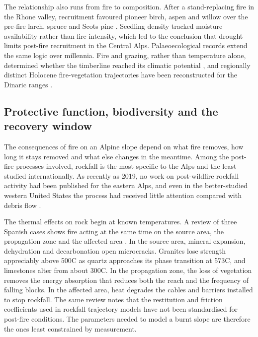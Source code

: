 \documentclass[11pt,a4paper]{article}
\begin{document}
The relationship also runs from fire to composition. After a stand-replacing fire in the Rhone valley, recruitment favoured pioneer birch, aspen and willow over the pre-fire larch, spruce and Scots pine \citep{moser_potential_2010}. Seedling density tracked moisture availability rather than fire intensity, which led to the conclusion that drought limits post-fire recruitment in the Central Alps. Palaeoecological records extend the same logic over millennia. Fire and grazing, rather than temperature alone, determined whether the timberline reached its climatic potential \citep{colombaroli_species_2010}, and regionally distinct Holocene fire-vegetation trajectories have been reconstructed for the Dinaric ranges \citep{cagliero_effect_nodate}.

\subsection{Protective function, biodiversity and the recovery window}

The consequences of fire on an Alpine slope depend on what fire removes, how long it stays removed and what else changes in the meantime. Among the post-fire processes involved, rockfall is the most specific to the Alps and the least studied internationally. As recently as 2019, no work on post-wildfire rockfall activity had been published for the eastern Alps, and even in the better-studied western United States the process had received little attention compared with debris flow \citep{melzner_brief_2019}.

The thermal effects on rock begin at known temperatures. A review of three Spanish cases shows fire acting at the same time on the source area, the propagation zone and the affected area \citep{sarro_effects_2021}. In the source area, mineral expansion, dehydration and decarbonation open microcracks. Granites lose strength appreciably above 500\degree{}C as quartz approaches its phase transition at 573\degree{}C, and limestones alter from about 300\degree{}C. In the propagation zone, the loss of vegetation removes the energy absorption that reduces both the reach and the frequency of falling blocks. In the affected area, heat degrades the cables and barriers installed to stop rockfall. The same review notes that the restitution and friction coefficients used in rockfall trajectory models have not been standardised for post-fire conditions. The parameters needed to model a burnt slope are therefore the ones least constrained by measurement.
\end{document}
